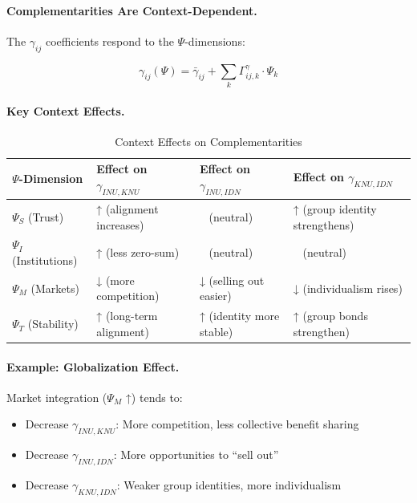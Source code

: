 \paragraph{Complementarities Are Context-Dependent.}
The $\gamma_{ij}$ coefficients respond to the $\Psi$-dimensions:

\begin{equation}
\gamma_{ij}(\Psi) = \bar{\gamma}_{ij} + \sum_k \Gamma^{\gamma}_{ij,k} \cdot \Psi_k
\end{equation}

\paragraph{Key Context Effects.}

\begin{table}[htbp]
\centering
\caption{Context Effects on Complementarities}
\label{tab:context-complementarities}
\renewcommand{\arraystretch}{1.3}
\begin{tabular}{@{}llll@{}}
\toprule
\textbf{$\Psi$-Dimension} & \textbf{Effect on $\gamma_{INU,KNU}$} & \textbf{Effect on $\gamma_{INU,IDN}$} & \textbf{Effect on $\gamma_{KNU,IDN}$} \\
\midrule
$\Psi_S$ (Trust) & ↑ (alignment increases) & ~ (neutral) & ↑ (group identity strengthens) \\
$\Psi_I$ (Institutions) & ↑ (less zero-sum) & ~ (neutral) & ~ (neutral) \\
$\Psi_M$ (Markets) & ↓ (more competition) & ↓ (selling out easier) & ↓ (individualism rises) \\
$\Psi_T$ (Stability) & ↑ (long-term alignment) & ↑ (identity more stable) & ↑ (group bonds strengthen) \\
\bottomrule
\end{tabular}
\end{table}

\paragraph{Example: Globalization Effect.}
Market integration ($\Psi_M$ ↑) tends to:
\begin{itemize}
\item Decrease $\gamma_{INU,KNU}$: More competition, less collective benefit sharing
\item Decrease $\gamma_{INU,IDN}$: More opportunities to ``sell out''
\item Decrease $\gamma_{KNU,IDN}$: Weaker group identities, more individualism
\end{itemize}

